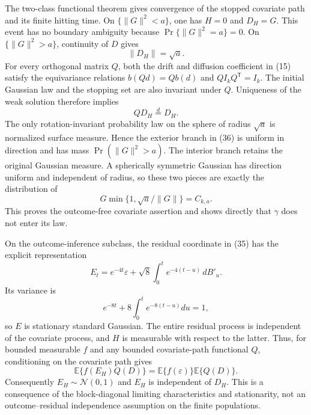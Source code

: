 The two-class functional theorem gives convergence of the stopped covariate path and its finite hitting time.  On \(\{\|G\|^2<a\}\), one has \(H=0\) and \(D_H=G\).  This event has no boundary ambiguity because \(\Pr\{\|G\|^2=a\}=0\).  On \(\{\|G\|^2>a\}\), continuity of \(D\) gives
\[
 \|D_H\|=\sqrt a. \tag{36}
\]
For every orthogonal matrix \(Q\), both the drift and diffusion coefficient in (15) satisfy the equivariance relations \(b(Qd)=Qb(d)\) and \(QI_kQ^{\mathsf T}=I_k\).  The initial Gaussian law and the stopping set are also invariant under \(Q\).  Uniqueness of the weak solution therefore implies
\[
 QD_H\overset d=D_H. \tag{37}
\]
The only rotation-invariant probability law on the sphere of radius \(\sqrt a\) is normalized surface measure.  Hence the exterior branch in (36) is uniform in direction and has mass \(\Pr(\|G\|^2>a)\).  The interior branch retains the original Gaussian measure.  A spherically symmetric Gaussian has direction uniform and independent of radius, so these two pieces are exactly the distribution of
\[
 G\min\{1,\sqrt a/\|G\|\}=C_{k,a}. \tag{38}
\]
This proves the outcome-free covariate assertion and shows directly that \(\gamma\) does not enter its law.

On the outcome-inference subclass, the residual coordinate in (35) has the explicit representation
\[
 E_t=e^{-4t}\varepsilon+\sqrt8\int_0^t e^{-4(t-u)}\,dB'_u. \tag{39}
\]
Its variance is
\[
 e^{-8t}+8\int_0^t e^{-8(t-u)}du=1, \tag{40}
\]
so \(E\) is stationary standard Gaussian.  The entire residual process is independent of the covariate process, and \(H\) is measurable with respect to the latter.  Thus, for bounded measurable \(f\) and any bounded covariate-path functional \(Q\), conditioning on the covariate path gives
\[
 \mathbb E\{f(E_H)Q(D)\}
 =\mathbb E\{f(\varepsilon)\}\mathbb E\{Q(D)\}. \tag{41}
\]
Consequently \(E_H\sim\mathcal N(0,1)\) and \(E_H\) is independent of \(D_H\).  This is a consequence of the block-diagonal limiting characteristics and stationarity, not an outcome--residual independence assumption on the finite populations.

